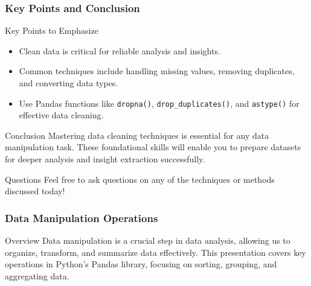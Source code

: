 \documentclass[aspectratio=169]{beamer}
\begin{document}
\begin{frame}
  \frametitle{Key Points and Conclusion}
  \begin{block}{Key Points to Emphasize}
    \begin{itemize}
      \item Clean data is critical for reliable analysis and insights.
      \item Common techniques include handling missing values, removing duplicates, and converting data types.
      \item Use Pandas functions like \texttt{dropna()}, \texttt{drop_duplicates()}, and \texttt{astype()} for effective data cleaning.
    \end{itemize}
  \end{block}

  \begin{block}{Conclusion}
    Mastering data cleaning techniques is essential for any data manipulation task. These foundational skills will enable you to prepare datasets for deeper analysis and insight extraction successfully.
  \end{block}
  
  \begin{block}{Questions}
    Feel free to ask questions on any of the techniques or methods discussed today!
  \end{block}
\end{frame}

\begin{frame}
    \frametitle{Data Manipulation Operations}
    \begin{block}{Overview}
        Data manipulation is a crucial step in data analysis, allowing us to organize, transform, and summarize data effectively. This presentation covers key operations in Python's Pandas library, focusing on sorting, grouping, and aggregating data.
    \end{block}
\end{frame}
\end{document}
